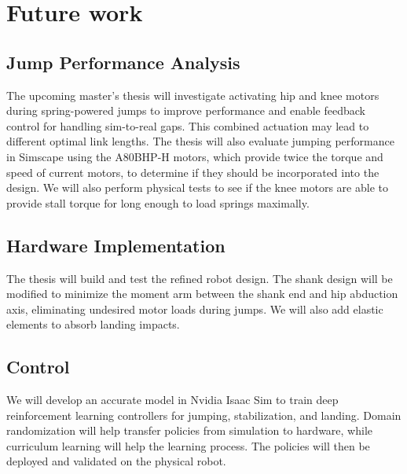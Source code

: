 \section{Future work}
\label{sec:future_work}

\subsection{Jump Performance Analysis}
The upcoming master's thesis will investigate activating hip and knee motors during spring-powered jumps to improve performance and enable feedback control for handling sim-to-real gaps. This combined actuation may lead to different optimal link lengths. The thesis will also evaluate jumping performance in Simscape using the A80BHP-H motors, which provide twice the torque and speed of current motors, to determine if they should be incorporated into the design. We will also perform physical tests to see if the knee motors are able to provide stall torque for long enough to load springs maximally.

\subsection{Hardware Implementation}
The thesis will build and test the refined robot design. The shank design will be modified to minimize the moment arm between the shank end and hip abduction axis, eliminating undesired motor loads during jumps. We will also add elastic elements to absorb landing impacts.

\subsection{Control} 
We will develop an accurate model in Nvidia Isaac Sim to train deep reinforcement learning controllers for jumping, stabilization, and landing. Domain randomization will help transfer policies from simulation to hardware, while curriculum learning will help the learning process. The policies will then be deployed and validated on the physical robot.
